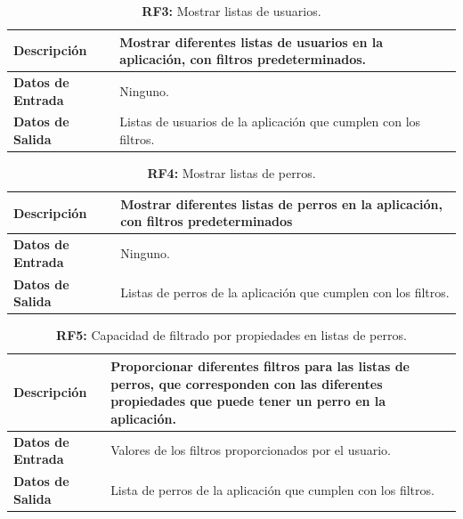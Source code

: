 \documentclass[a4paper, 12pt]{article}
\begin{document}
\begin{table}[H]
\captionsetup{justification=raggedright,singlelinecheck=false}
\caption{\textbf{RF3:} Mostrar listas de usuarios.}
\label{tab:RF23}
	\begin{tabular}{|m{5cm}|m{10cm}|}
	\hline
	\textbf{Descripción} & Mostrar diferentes listas de usuarios en la aplicación, con filtros predeterminados. \\ 
	\hline
	\textbf{Datos de Entrada} & Ninguno. \\ 
	\hline
	\textbf{Datos de Salida} & Listas de usuarios de la aplicación que cumplen con los filtros.  \\ 
	\hline
\end{tabular}
\end{table}

\begin{table}[H]
\captionsetup{justification=raggedright,singlelinecheck=false}
\caption{\textbf{RF4:} Mostrar listas de perros.}
\label{tab:RF4}
	\begin{tabular}{|m{5cm}|m{10cm}|}
	\hline
	\textbf{Descripción} & Mostrar diferentes listas de perros en la aplicación, con filtros predeterminados \\ 
	\hline
	\textbf{Datos de Entrada} & Ninguno. \\ 
	\hline
	\textbf{Datos de Salida} & Listas de perros de la aplicación que cumplen con los filtros. \\ 
	\hline
\end{tabular}
\end{table}

\begin{table}[H]
\captionsetup{justification=raggedright,singlelinecheck=false}
\caption{\textbf{RF5:} Capacidad de filtrado por propiedades en listas de perros.}
\label{tab:RF5}
	\begin{tabular}{|m{5cm}|m{10cm}|}
	\hline
	\textbf{Descripción} & Proporcionar diferentes filtros para las listas de perros, que corresponden con las diferentes propiedades que puede tener un perro en la aplicación. \\ 
	\hline
	\textbf{Datos de Entrada} & Valores de los filtros proporcionados por el usuario. \\ 
	\hline
	\textbf{Datos de Salida} & Lista de perros de la aplicación que cumplen con los filtros. \\ 
	\hline
\end{tabular}
\end{table}
\end{document}
